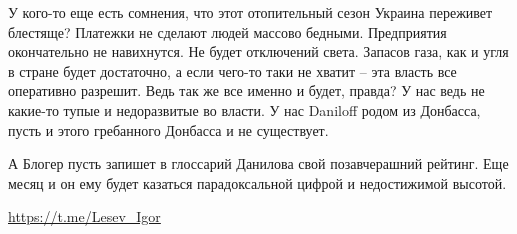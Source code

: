 У кого-то еще есть сомнения, что этот отопительный сезон Украина переживет
блестяще? Платежки не сделают людей массово бедными. Предприятия окончательно
не навихнутся. Не будет отключений света. Запасов газа, как и угля в стране
будет достаточно, а если чего-то таки не хватит – эта власть все оперативно
разрешит. Ведь так же все именно и будет, правда? У нас ведь не какие-то тупые
и недоразвитые во власти. У нас Daniloff родом из Донбасса, пусть и этого
гребанного Донбасса и не существует.

А Блогер пусть запишет в глоссарий Данилова свой позавчерашний рейтинг. Еще
месяц и он ему будет казаться парадоксальной цифрой и недостижимой высотой.

\url{https://t.me/Lesev_Igor}
